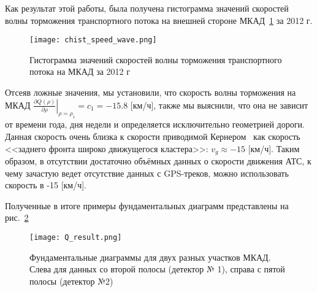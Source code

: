 Как результат этой работы, была получена гистограмма значений скоростей волны торможения транспортного потока на внешней стороне МКАД~\ref{fig:chist} за 2012 г.

\begin{figure}[ht]
\begin{center}
\texttt{[image: chist\_speed\_wave.png]}
\caption{Гистограмма значений скоростей волны торможения транспортного потока на МКАД за 2012 г}
\label{fig:chist}
\end{center}
\end{figure}
Отсеяв ложные значения, мы установили, что скорость волны торможения на МКАД \(\left.\frac{\partial Q(\rho)}{\partial \rho}\right|_{\rho = \rho_1} = c_1 = -15.8\) [км/ч], также мы выяснили, что она не зависит от времени года, дня недели и определяется исключительно геометрией дороги.
Данная скорость очень близка к скорости приводимой Кернером~\cite{kerner2009introduction} как скорость <<заднего фронта широко движущегося кластера>>: \(v_g \approx -15\) [км/ч].
Таким образом, в отсутствии достаточно объёмных данных о скорости движения АТС, к чему зачастую ведет отсутствие данных с GPS-треков, можно использовать скорость в -15 [км/ч].

Полученные в итоге примеры фундаментальных диаграмм представлены на рис.~\ref{fig:qresult}
\begin{figure}[ht]
\begin{center}
\texttt{[image: Q\_result.png]}
\caption{Фундаментальные диаграммы для двух разных участков МКАД. Слева для данных со второй полосы (детектор № 1), справа с пятой полосы (детектор №2)}
\label{fig:qresult}
\end{center}
\end{figure}

\FloatBarrier
